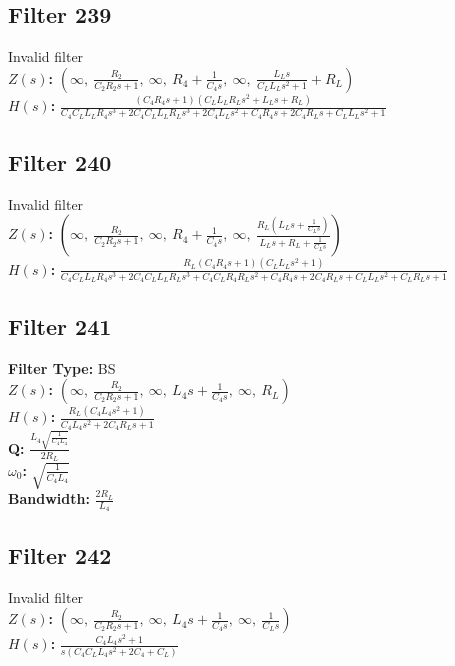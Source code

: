 \documentclass{article}
\begin{document}
\subsection*{Filter 239}
Invalid filter \\ 
\textbf{$Z(s)$:} $\left( \infty, \  \frac{R_{2}}{C_{2} R_{2} s + 1}, \  \infty, \  R_{4} + \frac{1}{C_{4} s}, \  \infty, \  \frac{L_{L} s}{C_{L} L_{L} s^{2} + 1} + R_{L}\right)$ \\ 
\textbf{$H(s)$:} $\frac{\left(C_{4} R_{4} s + 1\right) \left(C_{L} L_{L} R_{L} s^{2} + L_{L} s + R_{L}\right)}{C_{4} C_{L} L_{L} R_{4} s^{3} + 2 C_{4} C_{L} L_{L} R_{L} s^{3} + 2 C_{4} L_{L} s^{2} + C_{4} R_{4} s + 2 C_{4} R_{L} s + C_{L} L_{L} s^{2} + 1}$ \\ 
\subsection*{Filter 240}
Invalid filter \\ 
\textbf{$Z(s)$:} $\left( \infty, \  \frac{R_{2}}{C_{2} R_{2} s + 1}, \  \infty, \  R_{4} + \frac{1}{C_{4} s}, \  \infty, \  \frac{R_{L} \left(L_{L} s + \frac{1}{C_{L} s}\right)}{L_{L} s + R_{L} + \frac{1}{C_{L} s}}\right)$ \\ 
\textbf{$H(s)$:} $\frac{R_{L} \left(C_{4} R_{4} s + 1\right) \left(C_{L} L_{L} s^{2} + 1\right)}{C_{4} C_{L} L_{L} R_{4} s^{3} + 2 C_{4} C_{L} L_{L} R_{L} s^{3} + C_{4} C_{L} R_{4} R_{L} s^{2} + C_{4} R_{4} s + 2 C_{4} R_{L} s + C_{L} L_{L} s^{2} + C_{L} R_{L} s + 1}$ \\ 
\subsection*{Filter 241}
\textbf{Filter Type:} BS \\ 
\textbf{$Z(s)$:} $\left( \infty, \  \frac{R_{2}}{C_{2} R_{2} s + 1}, \  \infty, \  L_{4} s + \frac{1}{C_{4} s}, \  \infty, \  R_{L}\right)$ \\ 
\textbf{$H(s)$:} $\frac{R_{L} \left(C_{4} L_{4} s^{2} + 1\right)}{C_{4} L_{4} s^{2} + 2 C_{4} R_{L} s + 1}$ \\ 
\textbf{Q:} $\frac{L_{4} \sqrt{\frac{1}{C_{4} L_{4}}}}{2 R_{L}}$ \\ 
\textbf{$\omega_0$:} $\sqrt{\frac{1}{C_{4} L_{4}}}$ \\ 
\textbf{Bandwidth:} $\frac{2 R_{L}}{L_{4}}$ \\ 
\subsection*{Filter 242}
Invalid filter \\ 
\textbf{$Z(s)$:} $\left( \infty, \  \frac{R_{2}}{C_{2} R_{2} s + 1}, \  \infty, \  L_{4} s + \frac{1}{C_{4} s}, \  \infty, \  \frac{1}{C_{L} s}\right)$ \\ 
\textbf{$H(s)$:} $\frac{C_{4} L_{4} s^{2} + 1}{s \left(C_{4} C_{L} L_{4} s^{2} + 2 C_{4} + C_{L}\right)}$ \\ 
\end{document}
